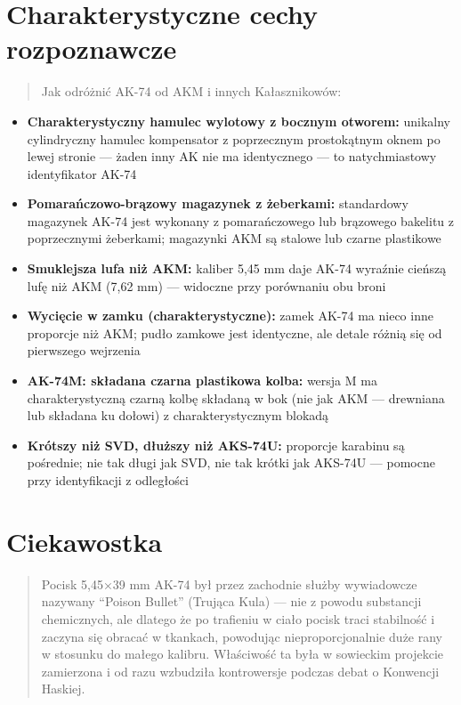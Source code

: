 \documentclass[12pt,openany,oneside]{book}
\providecommand{\tightlist}{%
  \setlength{\itemsep}{0pt}\setlength{\parskip}{0pt}}
\begin{document}
\section{Charakterystyczne cechy
rozpoznawcze}\label{charakterystyczne-cechy-rozpoznawcze-44}

\begin{quote}
Jak odróżnić AK-74 od AKM i innych Kałasznikowów:
\end{quote}

\begin{itemize}
\tightlist
\item
  \textbf{Charakterystyczny hamulec wylotowy z bocznym otworem:}
  unikalny cylindryczny hamulec kompensator z poprzecznym prostokątnym
  oknem po lewej stronie --- żaden inny AK nie ma identycznego --- to
  natychmiastowy identyfikator AK-74
\item
  \textbf{Pomarańczowo-brązowy magazynek z żeberkami:} standardowy
  magazynek AK-74 jest wykonany z pomarańczowego lub brązowego bakelitu
  z poprzecznymi żeberkami; magazynki AKM są stalowe lub czarne
  plastikowe
\item
  \textbf{Smuklejsza lufa niż AKM:} kaliber 5,45 mm daje AK-74 wyraźnie
  cieńszą lufę niż AKM (7,62 mm) --- widoczne przy porównaniu obu broni
\item
  \textbf{Wycięcie w zamku (charakterystyczne):} zamek AK-74 ma nieco
  inne proporcje niż AKM; pudło zamkowe jest identyczne, ale detale
  różnią się od pierwszego wejrzenia
\item
  \textbf{AK-74M: składana czarna plastikowa kolba:} wersja M ma
  charakterystyczną czarną kolbę składaną w bok (nie jak AKM ---
  drewniana lub składana ku dołowi) z charakterystycznym blokadą
\item
  \textbf{Krótszy niż SVD, dłuższy niż AKS-74U:} proporcje karabinu są
  pośrednie; nie tak długi jak SVD, nie tak krótki jak AKS-74U ---
  pomocne przy identyfikacji z odległości
\end{itemize}

\section{Ciekawostka}\label{ciekawostka-44}

\begin{quote}
Pocisk 5,45×39 mm AK-74 był przez zachodnie służby wywiadowcze nazywany
``Poison Bullet'' (Trująca Kula) --- nie z powodu substancji
chemicznych, ale dlatego że po trafieniu w ciało pocisk traci stabilność
i zaczyna się obracać w tkankach, powodując nieproporcjonalnie duże rany
w stosunku do małego kalibru. Właściwość ta była w sowieckim projekcie
zamierzona i od razu wzbudziła kontrowersje podczas debat o Konwencji
Haskiej.
\end{quote}
\end{document}
